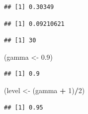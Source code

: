 \documentclass[
  12pt,
]{book}
\newenvironment{Shaded}{\begin{snugshade}}{\end{snugshade}}
\newcommand{\DecValTok}[1]{\textcolor[rgb]{0.00,0.00,0.81}{#1}}
\newcommand{\FloatTok}[1]{\textcolor[rgb]{0.00,0.00,0.81}{#1}}
\newcommand{\KeywordTok}[1]{\textcolor[rgb]{0.13,0.29,0.53}{\textbf{#1}}}
\newcommand{\NormalTok}[1]{#1}
\newcommand{\OperatorTok}[1]{\textcolor[rgb]{0.81,0.36,0.00}{\textbf{#1}}}
\newcommand{\StringTok}[1]{\textcolor[rgb]{0.31,0.60,0.02}{#1}}
\begin{document}
\begin{Shaded}
\end{Shaded}

\begin{verbatim}
## [1] 0.30349
\end{verbatim}

\begin{Shaded}
\end{Shaded}

\begin{verbatim}
## [1] 0.09210621
\end{verbatim}

\begin{Shaded}
\end{Shaded}

\begin{verbatim}
## [1] 30
\end{verbatim}

\begin{Shaded}
\begin{Highlighting}[]
\NormalTok{(gamma \textless{}{-}}\StringTok{ }\FloatTok{0.9}\NormalTok{)}
\end{Highlighting}
\end{Shaded}

\begin{verbatim}
## [1] 0.9
\end{verbatim}

\begin{Shaded}
\begin{Highlighting}[]
\NormalTok{(level \textless{}{-}}\StringTok{ }\NormalTok{(gamma }\OperatorTok{+}\StringTok{ }\DecValTok{1}\NormalTok{)}\OperatorTok{/}\DecValTok{2}\NormalTok{)}
\end{Highlighting}
\end{Shaded}

\begin{verbatim}
## [1] 0.95
\end{verbatim}
\end{document}
